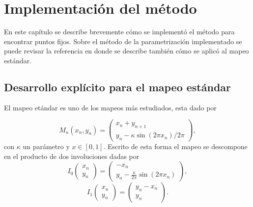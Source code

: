 
\chapter{Implementaci\'on del m\'etodo}
En este cap\'itulo se describe brevemente c\'omo se implement\'o el m\'etodo para encontrar puntos fijos. Sobre el m\'etodo de la parametrizaci\'on implementado se puede revisar la referencia \cite{eve} en donde se describe tambi\'en c\'omo se aplic\'o al mapeo est\'andar. 

\section{Desarrollo explícito para el mapeo estándar}

El mapeo et\'andar es uno de los mapeos m\'as estudiados, esta dado por 

\begin{equation}
M_{\kappa}(x_{n},y_{n}) = 
\left(\begin{array}{c}
x_{n} +y_{n+1} \\
y_{n}-\kappa\sin(2\pi x_{n})/2\pi
\end{array}\right),
\label{mapeo estandar}
\end{equation}
con $\kappa$ un par\'ametro y $x\in [0,1]$. Escrito de esta forma el mapeo se descompone en el producto de dos involuciones dadas por
\begin{equation}
I_{0}\left( \begin{array}{c}
x_{n}\\
y_{n}
\end{array}\right) = 
\left(\begin{array}{c}
-x_{n}\\
y_{n}-\frac{\kappa}{2\pi}\sin(2\pi x_{n})
\end{array}
\right),
\label{involucionA}
\end{equation}
\begin{equation}
I_{1}\left( \begin{array}{c}
x_{n}\\
y_{n}
\end{array}\right) = 
\left(\begin{array}{c}
y_{n}-x_{n}\\
y_{n}
\end{array}
\right).
\label{involucionB}
\end{equation}

